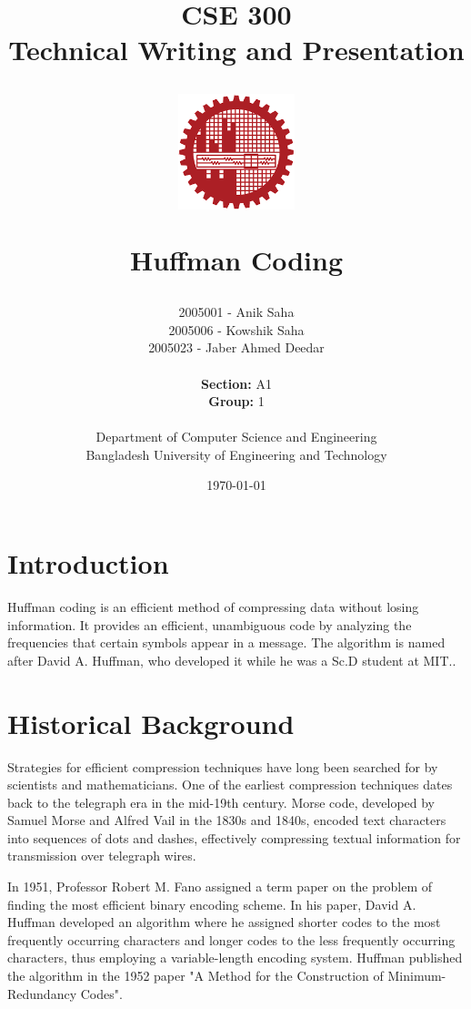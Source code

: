 \documentclass[18pt]{article}
\title{CSE 300 \\
	Technical Writing and Presentation \\
	
	\vspace{5mm}
	
	\begin{figure}[h]
		\centering
		\includegraphics[width=0.3\textwidth]{images/buet.png}
		\label{fig:enter-label}
	\end{figure}
	
	\textbf{Huffman Coding}}
\author{
	2005001 - Anik Saha\\
	2005006 - Kowshik Saha\\
	2005023 - Jaber Ahmed Deedar \\ \\
	\textbf{Section:} A1\\
	\textbf{Group:} 1\\ \\
	Department of Computer Science and Engineering\\
	Bangladesh University of Engineering and Technology\\
}
\date{\today}
\begin{document}
	\maketitle
	\pagebreak
	
	\setlength{\parskip}{0.5em}
	
	\tableofcontents
	
	\setlength{\parskip}{1em}
	\newpage
	
	\listoffigures
	\newpage
	
	\listoftables
	\newpage
	
	\newpage
	
	\section{Introduction}	
	
	Huffman coding is an efficient method of compressing data without
	losing information. It provides an efficient, unambiguous code by
	analyzing the frequencies that certain symbols appear in a message.
	The algorithm is named after David A. Huffman, who developed it
	while he was a Sc.D student at MIT..
	
	\section{Historical Background}
	
	Strategies for efficient compression techniques have long been searched for by scientists and mathematicians. One of the earliest compression techniques dates back to the telegraph era in the mid-19th century. Morse code, developed by Samuel Morse and Alfred Vail in the 1830s and 1840s, encoded text characters into sequences of dots and dashes, effectively compressing textual information for transmission over telegraph wires\cite{burns2004communications}. 
	
	In 1951, Professor Robert M. Fano assigned a term paper on the problem of
	finding the most efficient binary encoding scheme. In his paper, David A. Huffman
	developed an algorithm where he assigned shorter codes to the most
	frequently occurring characters and longer codes to the less frequently
	occurring characters, thus employing a variable-length encoding system. Huffman published the algorithm in the 1952 paper "A Method for the Construction of Minimum-Redundancy Codes".\cite{huffman1952}
	
\end{document}
